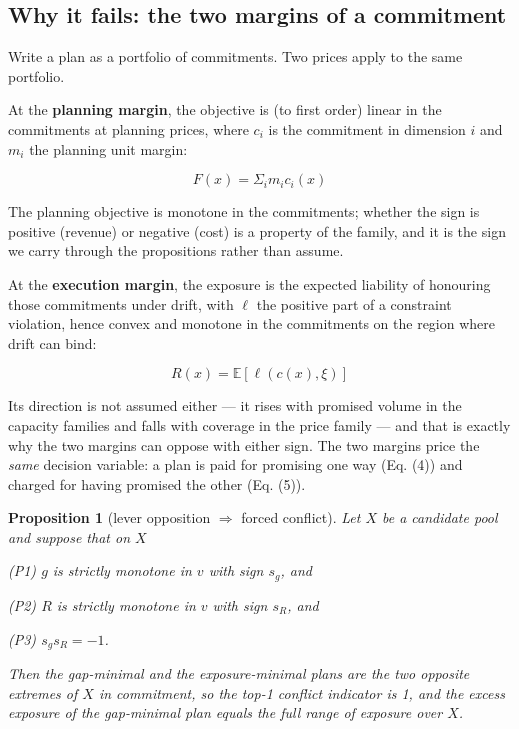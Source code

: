 \documentclass[preprint,12pt,letterpaper]{elsarticle}
\theoremstyle{definition}
\theoremstyle{plain}
\newtheorem{proposition}{Proposition}
\begin{document}
\subsection{Why it fails: the two margins of a commitment}

Write a plan as a portfolio of commitments. Two prices apply to the same portfolio.

At the \textbf{planning margin}, the objective is (to first order) linear in the commitments at planning prices, where $c_{i}$ is the commitment in dimension $i$ and $m_{i}$ the planning unit margin:

\begin{equation}
\tag{4}
F(x) = \Sigma_{i} m_{i} c_{i}(x)
\end{equation}

The planning objective is monotone in the commitments; whether the sign is positive (revenue) or negative (cost) is a property of the family, and it is the sign we carry through the propositions rather than assume.

At the \textbf{execution margin}, the exposure is the expected liability of honouring those commitments under drift, with $\ell$ the positive part of a constraint violation, hence convex and monotone in the commitments on the region where drift can bind:

\begin{equation}
\tag{5}
R(x) = \mathbb{E}[\ell(c(x), \xi)]
\end{equation}

Its direction is not assumed either --- it rises with promised volume in the capacity families and falls with coverage in the price family --- and that is exactly why the two margins can oppose with either sign. The two margins price the \textit{same} decision variable: a plan is paid for promising one way (Eq. (4)) and charged for having promised the other (Eq. (5)).

\begin{proposition}[lever opposition $\Rightarrow$ forced conflict]
Let $X$ be a candidate pool and suppose that on $X$

(P1) $g$ is strictly monotone in $v$ with sign $s_{g}$, and

(P2) $R$ is strictly monotone in $v$ with sign $s_{R}$, and

(P3) $s_{g} s_{R} = -1$.

Then the gap-minimal and the exposure-minimal plans are the two opposite extremes of $X$ in commitment, so the top-1 conflict indicator is 1, and the excess exposure of the gap-minimal plan equals the full range of exposure over $X$.
\end{proposition}
\end{document}
